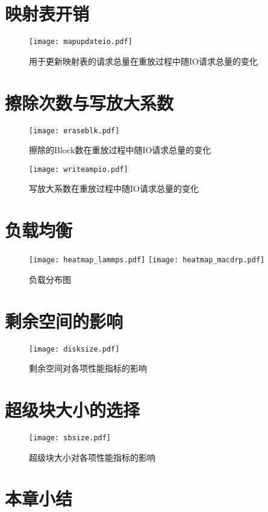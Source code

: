 \section{映射表开销}

\begin{figure}[H]
    \centering
    \texttt{[image: mapupdateio.pdf]}
    \caption{用于更新映射表的请求总量在重放过程中随IO请求总量的变化}
    \label{fig:res_mapupdate}
\end{figure}

\section{擦除次数与写放大系数}

\begin{figure}[H]
    \centering
    \texttt{[image: eraseblk.pdf]}
    \caption{擦除的Block数在重放过程中随IO请求总量的变化}
    \label{fig:res_writeamp}
\end{figure}

\begin{figure}[H]
    \centering
    \texttt{[image: writeampio.pdf]}
    \caption{写放大系数在重放过程中随IO请求总量的变化}
    \label{fig:res_writeamp}
\end{figure}

\section{负载均衡}

\begin{figure}[H]
    \centering
      {\texttt{[image: heatmap\_lammps.pdf]}}
    \vspace{4em}
        {\texttt{[image: heatmap\_macdrp.pdf]}}
    \caption{负载分布图}
    \label{fig:res_heatmap}
\end{figure}

\section{剩余空间的影响}

\begin{figure}[H]
    \centering
    \texttt{[image: disksize.pdf]}
    \caption{剩余空间对各项性能指标的影响}
    \label{fig:res_disksize}
\end{figure}

\section{超级块大小的选择}

\begin{figure}[H]
    \centering
    \texttt{[image: sbsize.pdf]}
    \caption{超级块大小对各项性能指标的影响}
    \label{fig:res_sbsize}
\end{figure}

\section{本章小结}